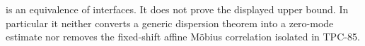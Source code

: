 \begin{remark}
 is an equivalence of interfaces.  It
does not prove the displayed upper bound.  In particular it neither
converts a generic dispersion theorem into a zero-mode estimate nor
removes the fixed-shift affine M\"obius correlation isolated in
TPC-85.
\end{remark}

